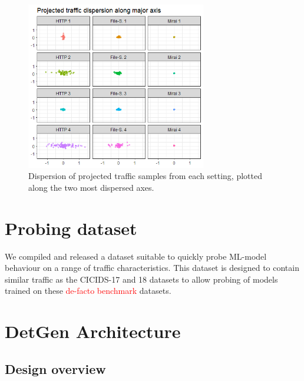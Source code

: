 \documentclass[runningheads]{llncs}
\begin{document}
\begin{figure}
\centering
\includegraphics[width=0.7\textwidth]{images/traffic_dispersion.png}
\caption{Dispersion of projected traffic samples from each setting, plotted along the two most dispersed axes.}\label{fig:Subspace_disp}
\end{figure}

\section{Probing dataset}

We compiled and released a dataset suitable to quickly probe ML-model behaviour on a range of traffic characteristics. This dataset is designed to contain similar traffic as the CICIDS-17 and 18 datasets to allow probing of models trained on these \textcolor{red}{de-facto benchmark} datasets. 

\section{DetGen Architecture}



\subsection{Design overview}
\end{document}
